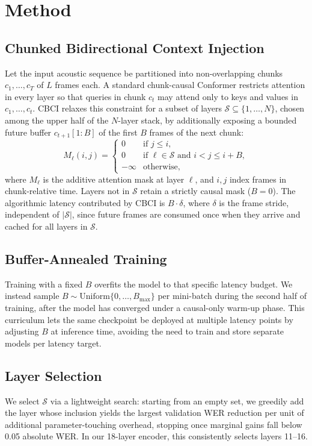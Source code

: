 \section{Method}
\subsection{Chunked Bidirectional Context Injection}
Let the input acoustic sequence be partitioned into non-overlapping chunks $c_1, \dots, c_T$ of $L$
frames each. A standard chunk-causal Conformer restricts attention in every layer so that queries in
chunk $c_t$ may attend only to keys and values in $c_1, \dots, c_t$. CBCI relaxes this constraint for a
subset of layers $\mathcal{S} \subseteq \{1, \dots, N\}$, chosen among the upper half of the $N$-layer
stack, by additionally exposing a bounded future buffer $c_{t+1}[1{:}B]$ of the first $B$ frames of the
next chunk:
\begin{equation}
\label{eq:cbci-mask}
M_\ell(i, j) =
\begin{cases}
0 & \text{if } j \le i, \\
0 & \text{if } \ell \in \mathcal{S} \text{ and } i < j \le i + B, \\
-\infty & \text{otherwise,}
\end{cases}
\end{equation}
where $M_\ell$ is the additive attention mask at layer $\ell$, and $i, j$ index frames in
chunk-relative time. Layers not in $\mathcal{S}$ retain a strictly causal mask ($B{=}0$). The
algorithmic latency contributed by CBCI is $B \cdot \delta$, where $\delta$ is the frame stride,
independent of $|\mathcal{S}|$, since future frames are consumed once when they arrive and cached for
all layers in $\mathcal{S}$.

\subsection{Buffer-Annealed Training}
Training with a fixed $B$ overfits the model to that specific latency budget. We instead sample
$B \sim \mathrm{Uniform}\{0, \dots, B_{\max}\}$ per mini-batch during the second half of training,
after the model has converged under a causal-only warm-up phase. This curriculum lets the same
checkpoint be deployed at multiple latency points by adjusting $B$ at inference time, avoiding the need
to train and store separate models per latency target.

\subsection{Layer Selection}
We select $\mathcal{S}$ via a lightweight search: starting from an empty set, we greedily add the layer
whose inclusion yields the largest validation WER reduction per unit of additional parameter-touching
overhead, stopping once marginal gains fall below 0.05 absolute WER. In our 18-layer encoder, this
consistently selects layers 11--16.
